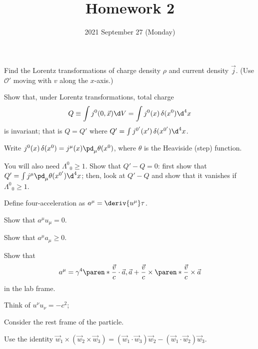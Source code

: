\documentclass{phys151}
\title{Homework 2}
\date{2021 September 27 (Monday)}
\author{}
\begin{document}
\begin{problem}
  \leavevmode
  \begin{subproblems}
  \item Find the Lorentz transformations of charge density \(\rho\) and current
    density \(\vec j\).  (Use \(\mathcal O'\) moving with \(v\) along the
    \(x\)-axis.)
  \item Show that, under Lorentz transformations, total charge
    \[
      Q \equiv \int j^0(0, \vec x) \d V
      = \int j^0(x) \, \delta(x^0) \d^4 x
    \]
    is invariant; that is \(Q = Q'\) where \(Q' = \int j^{0'}(x') \,
    \delta(x^{0'}) \d^4 x\).
  \end{subproblems}
  \begin{hint}
    Write  \(j^0(x) \, \delta(x^0) = j^\mu(x) \pd_\mu \theta(x^0)\), where
    \(\theta\) is the Heaviside (step) function.

    You will also need \({\Lambda^0}_0 \ge 1\).  Show that \(Q'-Q = 0\): first
    show that  \(Q' = \int j^\mu \pd_\mu \theta(x^{0'}) \d^4 x\); then, look at
    \(Q'-Q\) and show that it vanishes if \({\Lambda^0}_0 \ge 1\).
  \end{hint}
\end{problem}

\begin{solution}
  
\end{solution}

\begin{problem}
  Define four-acceleration as \(a^\mu = \deriv {u^\mu} \tau\).
  \begin{subproblems}
    \item Show that \(a^\mu u_\mu = 0\).
    \item Show that \(a^\mu a_\mu \ge 0\).
    \item Show that
      \[
        a^\mu = \gamma^4 \paren* {
          \frac {\vec v} c \cdot \vec a,
          \vec a + \frac {\vec v} c 
          \times \paren* {\frac {\vec v} c \times \vec a}
        }
      \]
      in the lab frame.
  \end{subproblems}
  \begin{hint}
    \leavevmode
    \begin{subproblems}
    \item Think of \(u^\nu u_\nu = -c^2\);
    \item Consider the rest frame of the particle.
    \item Use the identity
      \(
        \vec w_1 \times (\vec w_2 \times \vec w_3)
        = (\vec w_1 \cdot \vec w_3) \vec w_2 
        - (\vec w_1 \cdot \vec w_2) \vec w_3
      \).
    \end{subproblems}
  \end{hint}
\end{problem}
\end{document}
